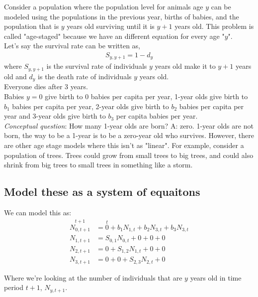 \documentclass{article}
\begin{document}
Consider a population where the population level for animals age $y$ can be modeled using the populations in the previous year, births of babies, and the population that is $y$ years old surviving until it is $y+1$ years old. This problem is called "age-staged" because we have an different equation for every age "$y$". \\

Let's say the survival rate can be written as,
\begin{align}
    S_{y, y+1} = 1-d_y
\end{align}
where $S_{y, y+1}$ is the survival rate of individuals $y$ years old make it to $y+1$ years old and $d_y$ is the death rate of individuals $y$ years old.\\

Everyone dies after 3 years. \\

Babies $y = 0$ give birth to $0$ babies per capita per year, 1-year olds give birth to $b_1$ babies per capita per year, 2-year olds give birth to $b_2$ babies per capita per year and 3-year olds give birth to $b_3$ per capita babies per year.\\

\textit{Conceptual question}: How many 1-year olds are born? A: zero. 1-year olds are not born, the way to be a 1-year is to be a zero-year old who survives. However, there are other age stage models where this isn't as "linear". For example, consider a population of trees. Trees could grow from small trees to big trees, and could also shrink from big trees to small trees in something like a storm.  

\subsection{Model these as a system of equaitons}

We can model this as:
\begin{align}
    \overset{t+1}{N_{0, t+1}} &= \overset{t}{0} + b_1  N_{1, t}+ b_2  N_{3, t} + b_3  N_{3, t}\\
    N_{1, t+1} &= S_{0,1} N_{0, t} + 0 + 0 + 0\\
    N_{2, t+1} &= 0+ S_{1,2} N_{1, t}+ 0 + 0\\
    N_{3, t+1} &= 0 + 0 + S_{2,3} N_{2, t} + 0
\end{align}

Where we're looking at the number of individuals that are $y$ years old in time period $t+1$, $N_{y, t+1}$.\\
\end{document}
